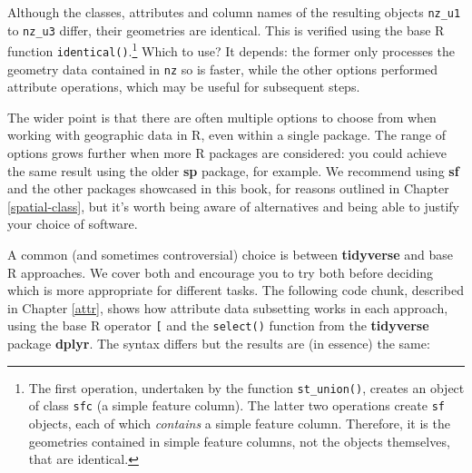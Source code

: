 \documentclass[]{krantz}
\newenvironment{Shaded}{\begin{snugshade}}{\end{snugshade}}
\newcommand{\CommentTok}[1]{\textcolor[rgb]{0.37,0.37,0.37}{\textit{#1}}}
\newcommand{\DataTypeTok}[1]{\textcolor[rgb]{0.27,0.27,0.27}{#1}}
\newcommand{\DecValTok}[1]{\textcolor[rgb]{0.06,0.06,0.06}{#1}}
\newcommand{\KeywordTok}[1]{\textcolor[rgb]{0.27,0.27,0.27}{\textbf{#1}}}
\newcommand{\NormalTok}[1]{#1}
\newcommand{\OperatorTok}[1]{\textcolor[rgb]{0.43,0.43,0.43}{\textbf{#1}}}
\newcommand{\StringTok}[1]{\textcolor[rgb]{0.5,0.5,0.5}{#1}}
\let\rmarkdownfootnote\footnote%
\def\footnote{\protect\rmarkdownfootnote}
\begin{document}
\begin{Shaded}
\end{Shaded}

Although the classes, attributes and column names of the resulting objects \texttt{nz\_u1} to \texttt{nz\_u3} differ, their geometries are identical.
This is verified using the base R function \texttt{identical()}.\footnote{The first operation, undertaken by the function \texttt{st\_union()}, creates an object of class \texttt{sfc} (a simple feature column).
  The latter two operations create \texttt{sf} objects, each of which \emph{contains} a simple feature column.
  Therefore, it is the geometries contained in simple feature columns, not the objects themselves, that are identical.}
Which to use?
It depends: the former only processes the geometry data contained in \texttt{nz} so is faster, while the other options performed attribute operations, which may be useful for subsequent steps.

The wider point is that there are often multiple options to choose from when working with geographic data in R, even within a single package.
The range of options grows further when more R packages are considered: you could achieve the same result using the older \textbf{sp} package, for example.
We recommend using \textbf{sf} and the other packages showcased in this book, for reasons outlined in Chapter \ref{spatial-class}, but it's worth being aware of alternatives and being able to justify your choice of software.

A common (and sometimes controversial) choice is between \textbf{tidyverse} and base R approaches.
We cover both and encourage you to try both before deciding which is more appropriate for different tasks.
The following code chunk, described in Chapter \ref{attr}, shows how attribute data subsetting works in each approach, using the base R operator \texttt{{[}} and the \texttt{select()} function from the \textbf{tidyverse} package \textbf{dplyr}.
The syntax differs but the results are (in essence) the same:
\end{document}
